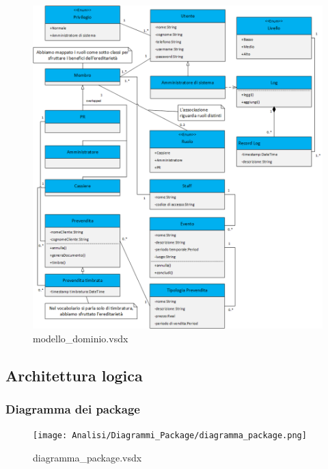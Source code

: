 \documentclass[a4paper]{article}
\begin{document}
\begin{figure}[H]
    \includegraphics[scale=0.68]{Analisi/modello_dominio.png}
    \centering
    \caption{modello\_dominio.vsdx}
\end{figure}

\newpage

\subsection{Architettura logica}

\subsubsection{Diagramma dei package}


\begin{figure}[H]
    \texttt{[image: Analisi/Diagrammi\_Package/diagramma\_package.png]}
    \centering
    \caption{diagramma\_package.vsdx}
\end{figure}
\end{document}
